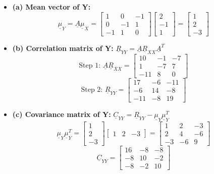 \documentclass[12pt]{article}
\begin{document}
\begin{itemize}
    \item \textbf{(a) Mean vector of Y:}
    \[
    \underline{\mu}_{Y} = \underline{A}\underline{\mu}_{X} = \begin{bmatrix} 1 & 0 & -1 \\ 0 & -1 & 1 \\ -1 & 1 & 0 \end{bmatrix} \begin{bmatrix} 2 \\ -1 \\ 1 \end{bmatrix} = \begin{bmatrix} 1 \\ 2 \\ -3 \end{bmatrix}
    \]
    \item \textbf{(b) Correlation matrix of Y:}
    $\underline{R}_{YY} = \underline{A}\underline{R}_{XX}\underline{A}^{T}$
    \[
    \text{Step 1: } \underline{A}\underline{R}_{XX} = \begin{bmatrix} 10 & -1 & -7 \\ 1 & -7 & 7 \\ -11 & 8 & 0 \end{bmatrix}
    \]
    \[
    \text{Step 2: } \underline{R}_{YY} = \begin{bmatrix} 17 & -6 & -11 \\ -6 & 14 & -8 \\ -11 & -8 & 19 \end{bmatrix}
    \]
    \item \textbf{(c) Covariance matrix of Y:}
    $\underline{C}_{YY} = \underline{R}_{YY} - \underline{\mu}_{Y}\underline{\mu}_{Y}^{T}$
    \[
    \underline{\mu}_{Y}\underline{\mu}_{Y}^{T} = \begin{bmatrix} 1 \\ 2 \\ -3 \end{bmatrix} \begin{bmatrix} 1 & 2 & -3 \end{bmatrix} = \begin{bmatrix} 1 & 2 & -3 \\ 2 & 4 & -6 \\ -3 & -6 & 9 \end{bmatrix}
    \]
    \[
    \underline{C}_{YY} = \begin{bmatrix} 16 & -8 & -8 \\ -8 & 10 & -2 \\ -8 & -2 & 10 \end{bmatrix}
    \]
\end{itemize}
\end{document}
